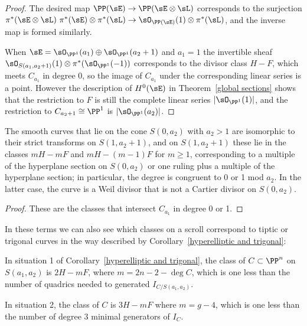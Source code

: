 \begin{proof} 
The desired map $\PP(\sE) \to \PP(\sE\otimes \sL)$ corresponds to the surjection 
$\pi^*(\sE \otimes\sL) \ \pi^*(\sE) \otimes \pi^*(\sL) \to \sO_{\PP(\sE)}(1) \otimes \pi^*(\sL)$, 
and the inverse map is formed similarly.

When $\sE = \sO_{\PP^1}(a_1)\oplus \sO_{\PP^1}(a_2+1)$ and $a_1 = 1$ the
invertible sheaf
$\sO_{S(a_1, a_{2}+1)}(1) \otimes \pi^{*}(\sO_{\PP^{1}}(-1))$ corresponds to the divisor class $H-F$, which meets $C_{a_1}$  in degree 0, so the image
of $C_{a_1}$ under the corresponding linear series is a point. However the description of  $H^0(\sE)$ in
Theorem~\ref{global sections} shows that the restriction to $F$
is still the complete linear series $|\sO_{\PP^1}(1)|$, and the restriction to $C_{{a_2}+1}\cong \PP^1$
is $|\sO_{\PP^1}(a_2)|$.
\end{proof}

\begin{corollary}\label{curves on a singular scroll}
 The smooth curves that lie on the cone $S(0,a_2)$ with $a_2>1$ are isomorphic to their strict transforms
 on $S(1,a_2+1)$, and on $S(1,a_2+1)$ these lie in the classes $mH-mF$ and $mH-(m-1)F$ for $m\geq 1$, 
 corresponding to a multiple of the hyperplane section on $S(0,a_2)$ or one ruling plus a multiple of the hyperplane section;
 in particular, the degree is congruent to 0 or 1 mod $a_2$. 
 In the latter case, the curve is a Weil divisor that is not a Cartier divisor on $S(0,a_2)$.
\end{corollary}

\begin{proof}
These are the classes that intersect $C_{a_1}$ in degree 0 or 1.
\end{proof}


In these terms we can also see which classes on a scroll correspond to tiptic or trigonal curves in the way described by Corollary~\ref{hyperelliptic and trigonal}:

\begin{corollary}\label{which class}
In situation 1 of Corollary~\ref{hyperelliptic and trigonal}, the class of $C\subset \PP^n$ on $S(a_1,a_2)$ is
$2H - mF$, where $m =  2n-2 - \deg C$, which is one less than the number of quadrics needed to generated $I_{C/S(a_1,a_2)}$.

In situation 2, the class of $C$ is 
$3H -  mF$ where $m = g-4$, which is one less than the number of degree 3 minimal generators of $I_{C}.$
\end{corollary}

